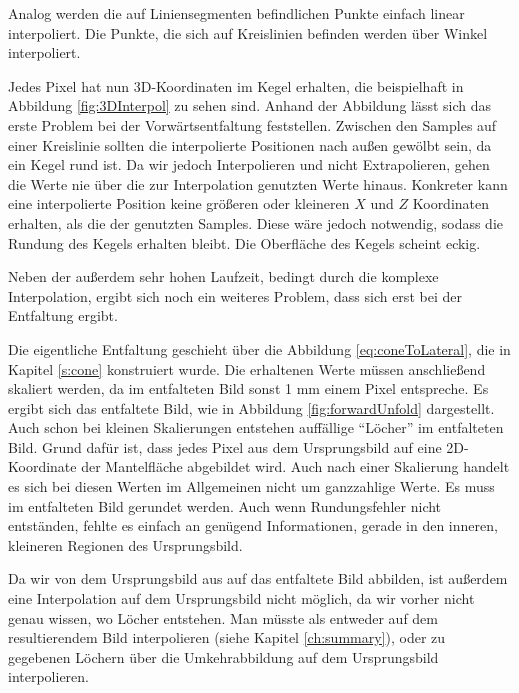 Analog werden die auf Liniensegmenten befindlichen Punkte einfach linear interpoliert. Die Punkte, die sich auf Kreislinien befinden werden über Winkel interpoliert. 

Jedes Pixel hat nun 3D-Koordinaten im Kegel erhalten, die beispielhaft in Abbildung \ref{fig:3DInterpol} zu sehen sind.
Anhand der Abbildung lässt sich das erste Problem bei der Vorwärtsentfaltung feststellen. Zwischen den Samples auf einer Kreislinie sollten die interpolierte Positionen nach außen gewölbt sein, da ein Kegel rund ist. Da wir jedoch Interpolieren und nicht Extrapolieren, gehen die Werte nie über die zur Interpolation genutzten Werte hinaus. Konkreter kann eine interpolierte Position keine größeren oder kleineren $X$ und $Z$ Koordinaten erhalten, als die der genutzten Samples. Diese wäre jedoch notwendig, sodass die Rundung des Kegels erhalten bleibt. Die Oberfläche des Kegels scheint eckig. 

Neben der außerdem sehr hohen Laufzeit, bedingt durch die komplexe Interpolation, ergibt sich noch ein weiteres Problem, dass sich erst bei der Entfaltung ergibt. 

Die eigentliche Entfaltung geschieht über die Abbildung \ref{eq:coneToLateral}, die in Kapitel \ref{s:cone} konstruiert wurde. Die erhaltenen Werte müssen anschließend skaliert werden, da im entfalteten Bild sonst 1 mm einem Pixel entspreche. Es ergibt sich das entfaltete Bild, wie in Abbildung \ref{fig:forwardUnfold} dargestellt. Auch schon bei kleinen Skalierungen entstehen auffällige "`Löcher"' im entfalteten Bild. Grund dafür ist, dass jedes Pixel aus dem Ursprungsbild auf eine 2D-Koordinate der Mantelfläche abgebildet wird. Auch nach einer Skalierung handelt es sich bei diesen Werten im Allgemeinen nicht um ganzzahlige Werte. Es muss im entfalteten Bild gerundet werden. Auch wenn Rundungsfehler nicht entständen, fehlte es einfach an genügend Informationen, gerade in den inneren, kleineren Regionen des Ursprungsbild.

Da wir von dem Ursprungsbild aus auf das entfaltete Bild abbilden, ist außerdem eine Interpolation auf dem Ursprungsbild nicht möglich, da wir vorher nicht genau wissen, wo Löcher entstehen. Man müsste als entweder auf dem resultierendem Bild interpolieren (siehe Kapitel \ref{ch:summary}), oder zu gegebenen Löchern über die Umkehrabbildung auf dem Ursprungsbild interpolieren. 

